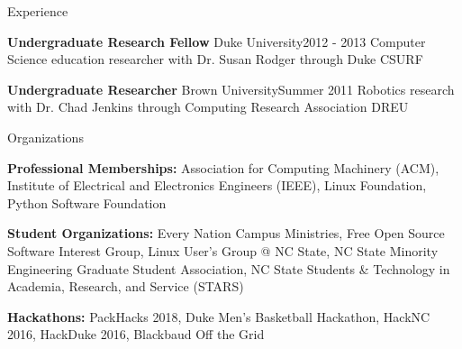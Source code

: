 \documentclass{resume} %
\begin{document}
\begin{rSection}{Experience}
\begin{eSubsection}{\textbf{Undergraduate Research Fellow} Duke University}{2012 - 2013}
{Computer Science education researcher with Dr. Susan Rodger through Duke CSURF}
\end{eSubsection}
\vspace{-5pt}

\begin{eSubsection}{\textbf{Undergraduate Researcher} Brown University}{Summer 2011}
{Robotics research with Dr. Chad Jenkins through Computing Research Association DREU}
\end{eSubsection}
\vspace{-5pt}
\end{rSection}
\vspace{-7pt}
\begin{rSection}{Organizations}
\vspace{-4pt}
\begin{sSubsection}
    {\textbf{Professional Memberships:} Association for Computing Machinery (ACM), Institute of Electrical and Electronics Engineers (IEEE), Linux Foundation, Python Software Foundation}{}
\end{sSubsection}
\vspace{-5pt}
\begin{sSubsection}
    {\textbf{Student Organizations:} Every Nation Campus Ministries, Free Open Source Software Interest Group, Linux User's Group @ NC State, NC State Minority Engineering Graduate Student Association, NC State Students \& Technology in Academia, Research, and Service (STARS)}{}
\end{sSubsection}
\vspace{-5pt}
\begin{sSubsection}
    {\textbf{Hackathons:} PackHacks 2018, Duke Men's Basketball Hackathon, HackNC 2016, HackDuke 2016, Blackbaud Off the Grid}{}
\end{sSubsection}
\vspace{-5pt}
\end{rSection}
\end{document}
